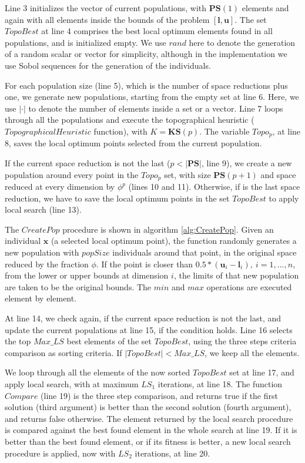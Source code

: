 Line 3 initializes the vector of current populations, with $\bm{PS}(1)$ elements and again with all elements inside the bounds of the problem $[\bm{l}, \bm{u}]$. The set $TopoBest$ at line 4 comprises the best local optimum elements found in all populations, and is initialized empty. We use $rand$ here to denote the generation of a random scalar or vector for simplicity, although in the implementation we use Sobol sequences for the generation of the individuals.

For each population size (line 5), which is the number of space reductions plus one, we generate new populations, starting from the empty set at line 6. Here, we use $|\cdot|$ to denote the number of elements inside a set or a vector. Line 7 loops through all the populations and execute the topographical heuristic ($TopographicalHeuristic$ function), with $K = \bm{KS}(p)$. The variable $Topo_p$, at line 8, saves the local optimum points selected from the current population.

If the current space reduction is not the last ($p < |\bm{PS}|$, line 9), we create a new population around every point in the $Topo_p$ set, with size $\bm{PS}(p + 1)$ and space reduced at every dimension by $\phi^p$ (lines 10 and 11). Otherwise, if is the last space reduction, we have to save the local optimum points in the set $TopoBest$ to apply local search (line 13).





The $CreatePop$ procedure is shown in algorithm \ref{alg:CreatePop}. Given an individual $\bm{x}$ (a selected local optimum point), the function randomly generates a new population with $popSize$ individuals around that point, in the original space reduced by the fraction $\phi$. If the point is closer than $0.5 * (\bm{u}_i - \bm{l}_i), \ i = 1, ..., n$, from the lower or upper bounds at dimension $i$, the limits of that new population are taken to be the original bounds. The $min$ and $max$ operations are executed element by element.


At line 14, we check again, if the current space reduction is not the last, and update the current populations at line 15, if the condition holds. Line 16 selects the top $Max\_LS$ best elements of the set $TopoBest$, using the three steps criteria comparison as sorting criteria. If $|TopoBest| < Max\_LS$, we keep all the elements.

We loop through all the elements of the now sorted $TopoBest$ set at line 17, and apply local search, with at maximum $LS_1$ iterations, at line 18. The function $Compare$ (line 19) is the three step comparison, and returns true if the first solution (third argument) is better than the second solution (fourth argument), and returns false otherwise. The element returned by the local search procedure is compared against the best found element in the whole search at line 19. If it is better than the best found element, or if its fitness is better, a new local search procedure is applied, now with $LS_2$ iterations, at line 20.


